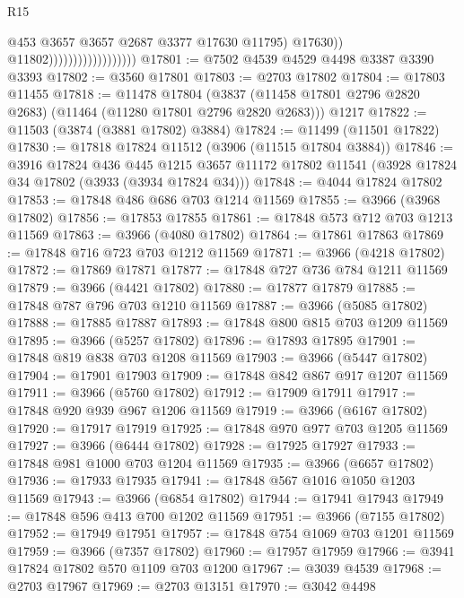 \begin{lexlean}{R15}
\begin{coremodule}
                                              @453
                                              @3657
                                              @3657
                                              @2687
                                              @3377
                                              @17630
                                              @11795)
                                            @17630))
                                        @11802))))))))))))))))))
@17801 := @7502 @4539 @4529 @4498 @3387 @3390 @3393
@17802 := @3560 @17801
@17803 := @2703 @17802
@17804 := @17803 @11455
@17818 := @11478
    @17804
    (@3837 (@11458 @17801 @2796 @2820 @2683) (@11464 (@11280 @17801 @2796 @2820 @2683)))
    @1217
@17822 := @11503 (@3874 (@3881 @17802) @3884)
@17824 := @11499 (@11501 @17822)
@17830 := @17818 @17824 @11512 (@3906 (@11515 @17804 @3884))
@17846 := @3916
    @17824
    @436
    @445
    @1215
    @3657
    @11172
    @17802
    @11541
    (@3928 @17824 @34 @17802 (@3933 (@3934 @17824 @34)))
@17848 := @4044 @17824 @17802
@17853 := @17848 @486 @686 @703 @1214 @11569
@17855 := @3966 (@3968 @17802)
@17856 := @17853 @17855
@17861 := @17848 @573 @712 @703 @1213 @11569
@17863 := @3966 (@4080 @17802)
@17864 := @17861 @17863
@17869 := @17848 @716 @723 @703 @1212 @11569
@17871 := @3966 (@4218 @17802)
@17872 := @17869 @17871
@17877 := @17848 @727 @736 @784 @1211 @11569
@17879 := @3966 (@4421 @17802)
@17880 := @17877 @17879
@17885 := @17848 @787 @796 @703 @1210 @11569
@17887 := @3966 (@5085 @17802)
@17888 := @17885 @17887
@17893 := @17848 @800 @815 @703 @1209 @11569
@17895 := @3966 (@5257 @17802)
@17896 := @17893 @17895
@17901 := @17848 @819 @838 @703 @1208 @11569
@17903 := @3966 (@5447 @17802)
@17904 := @17901 @17903
@17909 := @17848 @842 @867 @917 @1207 @11569
@17911 := @3966 (@5760 @17802)
@17912 := @17909 @17911
@17917 := @17848 @920 @939 @967 @1206 @11569
@17919 := @3966 (@6167 @17802)
@17920 := @17917 @17919
@17925 := @17848 @970 @977 @703 @1205 @11569
@17927 := @3966 (@6444 @17802)
@17928 := @17925 @17927
@17933 := @17848 @981 @1000 @703 @1204 @11569
@17935 := @3966 (@6657 @17802)
@17936 := @17933 @17935
@17941 := @17848 @567 @1016 @1050 @1203 @11569
@17943 := @3966 (@6854 @17802)
@17944 := @17941 @17943
@17949 := @17848 @596 @413 @700 @1202 @11569
@17951 := @3966 (@7155 @17802)
@17952 := @17949 @17951
@17957 := @17848 @754 @1069 @703 @1201 @11569
@17959 := @3966 (@7357 @17802)
@17960 := @17957 @17959
@17966 := @3941 @17824 @17802 @570 @1109 @703 @1200
@17967 := @3039 @4539
@17968 := @2703 @17967
@17969 := @2703 @13151
@17970 := @3042 @4498

\end{coremodule}
\end{lexlean}
